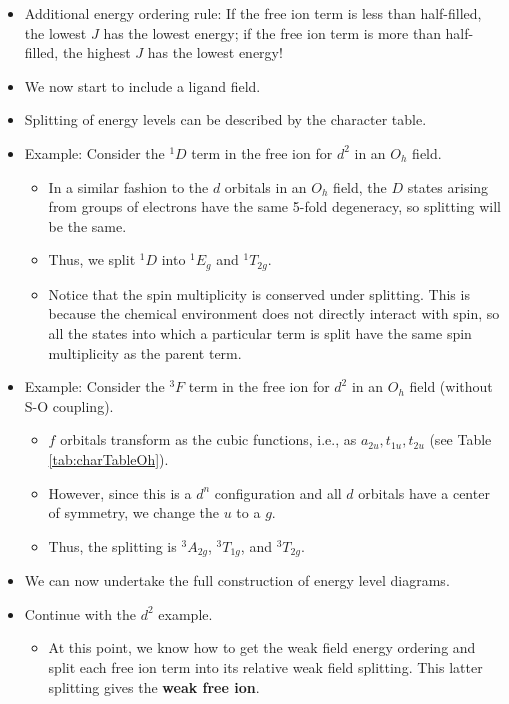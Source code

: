 \documentclass[../notes.tex]{subfiles}
\begin{document}
\begin{itemize}
\begin{itemize}
    \end{itemize}
    \item Additional energy ordering rule: If the free ion term is less than half-filled, the lowest $J$ has the lowest energy; if the free ion term is more than half-filled, the highest $J$ has the lowest energy!
    \item We now start to include a ligand field.
    \item Splitting of energy levels can be described by the character table.
    \item Example: Consider the ${}^1D$ term in the free ion for $d^2$ in an $O_h$ field.
    \begin{itemize}
        \item In a similar fashion to the $d$ orbitals in an $O_h$ field, the $D$ states arising from groups of electrons have the same 5-fold degeneracy, so splitting will be the same.
        \item Thus, we split ${}^1D$ into ${}^1E_g$ and ${}^1T_{2g}$.
        \item Notice that the spin multiplicity is conserved under splitting. This is because the chemical environment does not directly interact with spin, so all the states into which a particular term is split have the same spin multiplicity as the parent term.
    \end{itemize}
    \item Example: Consider the ${}^3F$ term in the free ion for $d^2$ in an $O_h$ field (without S-O coupling).
    \begin{itemize}
        \item $f$ orbitals transform as the cubic functions, i.e., as $a_{2u},t_{1u},t_{2u}$ (see Table \ref{tab:charTableOh}).
        \item However, since this is a $d^n$ configuration and all $d$ orbitals have a center of symmetry, we change the $u$ to a $g$.
        \item Thus, the splitting is ${}^3A_{2g}$, ${}^3T_{1g}$, and ${}^3T_{2g}$.
    \end{itemize}
    \item We can now undertake the full construction of energy level diagrams.
    \item Continue with the $d^2$ example.
    \begin{itemize}
        \item At this point, we know how to get the weak field energy ordering and split each free ion term into its relative weak field splitting. This latter splitting gives the \textbf{weak free ion}.

\end{itemize}
\end{itemize}
\end{document}
